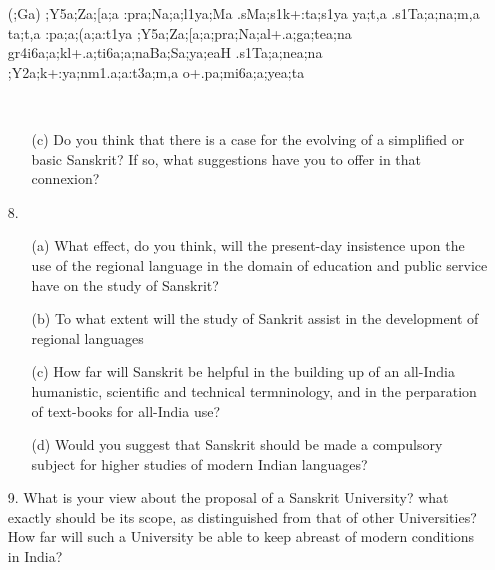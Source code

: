 \begin{spacing}{1.15}
\begin{itemize}
\begin{itemize}
 \item[({\sktf ;Ga})] {\ZF{-};Y5a;Za;[a;a%
\ZF{-}:pra;Na;a;l1ya;Ma .sMa;s1k+:ta;s1ya ya;t,a
.s1Ta;a;na;m,a\ZF{,} ta;t,a :pa;a;(a;a:t1ya%
\ZF{-};Y5a;Za;[a;a;pra;Na;al+.a;ga;tea;na gr4i6a;a;k\ZF{-}l+.a;ti6a;a;na\ZF{-}Ba;Sa;ya;eaH%
 .s1Ta;a;nea;na ;Y2a;k+:ya;nm1.a;a:t3a;m,a o+.pa;mi6a;a;yea;ta
} 
                               
 \end{itemize}
\end{itemize} 
\end{spacing}
{\rm 
\begin{itemize} 
\item[~]
\begin{itemize}
\item[(c)]  Do you think that there is a case for the evolving of a simplified or basic Sanskrit? If so, what suggestions have you to offer in that connexion?
            \end{itemize}

 \item[8.] \begin{itemize}
           \item[(a)] What effect, do you think, will the present-day insistence upon the use of the regional language in the domain of education and public service have on the study of Sanskrit? 
            
          \item[(b)] To what extent will the study of Sankrit assist in the development of regional languages %

         \item[(c)] How far will Sanskrit be helpful in the building up of an all-India humanistic, scientific and technical termninology, and in the perparation of text-books for all-India use?
            
        \item[(d)] Would you suggest that Sanskrit should be made a compulsory subject for higher studies of modern Indian languages?
       \end{itemize}   
             
\item[9.] What is your view about the proposal of a Sanskrit University? what exactly should be its scope, as distinguished from that of other Universities?  How far will such a University be able to keep abreast of modern conditions in India?                      
\end{itemize}
}

